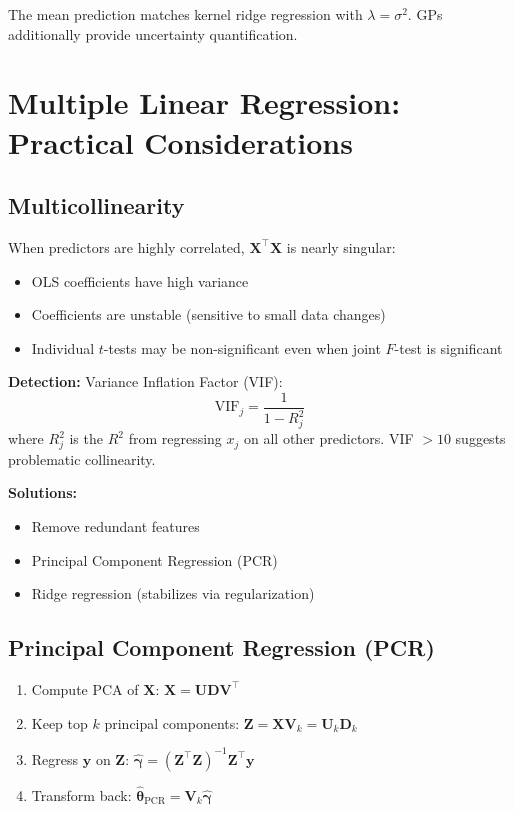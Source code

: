 \documentclass[main.tex]{subfiles}
\begin{document}
The mean prediction matches kernel ridge regression with $\lambda = \sigma^2$. GPs additionally provide uncertainty quantification.

\needspace{0.33\textheight}
\section{Multiple Linear Regression: Practical Considerations}

\subsection{Multicollinearity}

When predictors are highly correlated, $\mathbf{X}^\top\mathbf{X}$ is nearly singular:
\begin{itemize}
    \item OLS coefficients have high variance
    \item Coefficients are unstable (sensitive to small data changes)
    \item Individual $t$-tests may be non-significant even when joint $F$-test is significant
\end{itemize}

\textbf{Detection:} Variance Inflation Factor (VIF):
$$\text{VIF}_j = \frac{1}{1 - R_j^2}$$
where $R_j^2$ is the $R^2$ from regressing $x_j$ on all other predictors. VIF $> 10$ suggests problematic collinearity.

\textbf{Solutions:}
\begin{itemize}
    \item Remove redundant features
    \item Principal Component Regression (PCR)
    \item Ridge regression (stabilizes via regularization)
\end{itemize}

\subsection{Principal Component Regression (PCR)}

\begin{enumerate}
    \item Compute PCA of $\mathbf{X}$: $\mathbf{X} = \mathbf{U}\mathbf{D}\mathbf{V}^\top$
    \item Keep top $k$ principal components: $\mathbf{Z} = \mathbf{X}\mathbf{V}_k = \mathbf{U}_k\mathbf{D}_k$
    \item Regress $\mathbf{y}$ on $\mathbf{Z}$: $\hat{\boldsymbol{\gamma}} = (\mathbf{Z}^\top\mathbf{Z})^{-1}\mathbf{Z}^\top\mathbf{y}$
    \item Transform back: $\hat{\boldsymbol{\theta}}_{\text{PCR}} = \mathbf{V}_k\hat{\boldsymbol{\gamma}}$
\end{enumerate}
\end{document}
